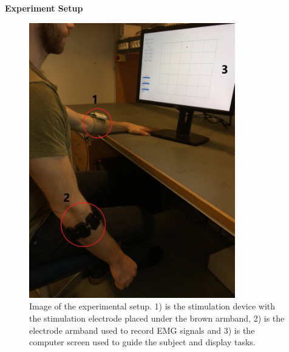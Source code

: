 \newpage
\textbf{{\Large Experiment Setup}} \\

\begin{figure}[H]                 
	\includegraphics[width=0.8\textwidth]{figures/setupimg}  
	\caption{Image of the experimental setup. 1) is the stimulation device with the stimulation electrode placed under the brown armband, 2) is the electrode armband used to record EMG signals and 3) is the computer screen used to guide the subject and display tasks.} 
	\label{fig:setup} 
\end{figure}


